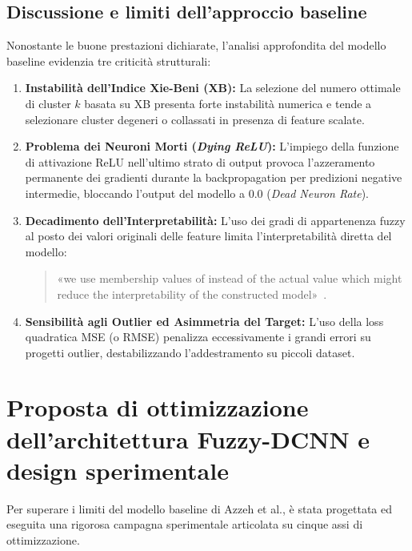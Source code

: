 \documentclass[11pt, a4paper]{article}
\begin{document}
\subsection{Discussione e limiti dell'approccio baseline}
Nonostante le buone prestazioni dichiarate, l'analisi approfondita del modello baseline evidenzia tre criticità strutturali:
\begin{enumerate}
    \item \textbf{Instabilità dell'Indice Xie-Beni (XB):} La selezione del numero ottimale di cluster $k$ basata su XB presenta forte instabilità numerica e tende a selezionare cluster degeneri o collassati in presenza di feature scalate.
    \item \textbf{Problema dei Neuroni Morti (\textit{Dying ReLU}):} L'impiego della funzione di attivazione ReLU nell'ultimo strato di output provoca l'azzeramento permanente dei gradienti durante la backpropagation per predizioni negative intermedie, bloccando l'output del modello a $0.0$ (\textit{Dead Neuron Rate}).
    \item \textbf{Decadimento dell'Interpretabilità:} L'uso dei gradi di appartenenza fuzzy al posto dei valori originali delle feature limita l'interpretabilità diretta del modello: \begin{quote} «we use membership values of instead of the actual value which might reduce the interpretability of the constructed model»~\cite{article}.\end{quote}
    \item \textbf{Sensibilità agli Outlier ed Asimmetria del Target:} L'uso della loss quadratica MSE (o RMSE) penalizza eccessivamente i grandi errori su progetti outlier, destabilizzando l'addestramento su piccoli dataset.
\end{enumerate}

\section{Proposta di ottimizzazione dell'architettura Fuzzy-DCNN e design sperimentale}\label{sec:ottimizzazione}
Per superare i limiti del modello baseline di Azzeh et al., è stata progettata ed eseguita una rigorosa campagna sperimentale articolata su cinque assi di ottimizzazione.
\end{document}
